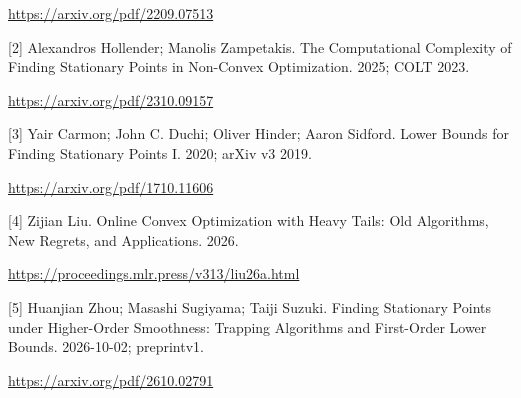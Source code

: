 \documentclass[10pt,a4paper]{article}
\begin{document}
\url{https://arxiv.org/pdf/2209.07513}

[2] Alexandros Hollender; Manolis Zampetakis. The Computational Complexity of Finding Stationary Points in Non-Convex Optimization. 2025; COLT 2023.

\url{https://arxiv.org/pdf/2310.09157}

[3] Yair Carmon; John C. Duchi; Oliver Hinder; Aaron Sidford. Lower Bounds for Finding Stationary Points I. 2020; arXiv v3 2019.

\url{https://arxiv.org/pdf/1710.11606}

[4] Zijian Liu. Online Convex Optimization with Heavy Tails: Old Algorithms, New Regrets, and Applications. 2026.

\url{https://proceedings.mlr.press/v313/liu26a.html}

[5] Huanjian Zhou; Masashi Sugiyama; Taiji Suzuki. Finding Stationary Points under Higher-Order Smoothness: Trapping Algorithms and First-Order Lower Bounds. 2026-10-02; preprintv1.

\url{https://arxiv.org/pdf/2610.02791}
\end{document}
